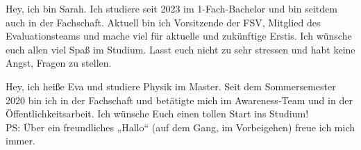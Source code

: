 \begin{multicols}{2}
\vspace{-1.2cm}

{
Hey, ich bin Sarah. Ich studiere seit 2023 im 1-Fach-Bachelor und bin seitdem auch in der Fachschaft. Aktuell bin ich Vorsitzende der FSV, Mitglied des Evaluationsteams und mache viel für aktuelle und zukünftige Erstis. Ich wünsche euch allen viel Spaß im Studium. Lasst euch nicht zu sehr stressen und habt keine Angst, Fragen zu stellen.
}

\vspace{-1.2cm}

{
Hey, ich heiße Eva und studiere Physik im Master. Seit dem Sommersemester 2020 bin ich in der Fachschaft und betätigte mich im Awareness-Team und in der Öffentlichkeitsarbeit.
Ich wünsche Euch einen tollen Start ins Studium! \\ PS: Über ein freundliches „Hallo“ (auf dem Gang, im Vorbeigehen) freue ich mich immer.
} 



\end{multicols}
